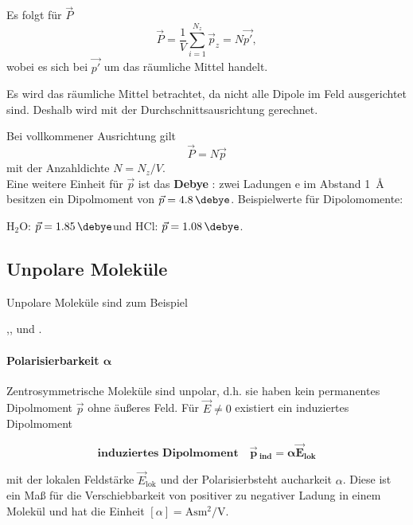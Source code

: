 
    Es folgt für $\vec{P}$
    \begin{equation}
    	\label{2.5}
    	\vec{P} = \frac{1}{V} \sum_{i = 1}^{N_{z}} \vec{p}_{z}= N \vec{p'},
    \end{equation}
    wobei es sich bei $\vec{p'}$ um das räumliche Mittel handelt.
    \begin{verbal}
        Es wird das räumliche Mittel betrachtet, da nicht alle Dipole im Feld ausgerichtet sind. Deshalb wird mit der Durchschnittsausrichtung gerechnet.
    \end{verbal}
    Bei vollkommener Ausrichtung gilt
    \begin{equation}
    	\vec{P} = N \vec{p}
    \end{equation}
    mit der Anzahldichte $N = N_{z}/V$.\\
    
    Eine weitere Einheit für $\vec{p}$ ist das \textbf{Debye} \si{\debye}: 
    zwei Ladungen e im Abstand \SI{1}{\angstrom} besitzen ein Dipolmoment von $ \vec{p} = \SI{4,8}{\debye}$. 
    Beispielwerte für Dipolomomente:
    \begin{center}
        H${}_2$O: $\vec p=\SI{1,85}{\debye}$\quad und \quad HCl: $\vec p=\SI{1,08}{\debye}$.
    \end{center}
    \subsection{Unpolare Moleküle}
    Unpolare Moleküle sind zum Beispiel
    \begin{center}
    	,\qquad {},\qquad {} \qquad und \qquad{}.
    \end{center}

\paragraph{Polarisierbarkeit $\bm\alpha$}
    Zentrosymmetrische Moleküle sind unpolar, d.h. sie haben kein permanentes Dipolmoment $\vec{p}$ ohne äußeres Feld. Für $\vec{E} \neq 0$ existiert ein induziertes Dipolmoment

    \begin{important}
        \begin{equation}
            \textbf{induziertes Dipolmoment}\quad
        	\bm{\vec{p}\,_{\textbf{ind}} = \alpha \vec{E}_{\textbf{lok}}}
        \end{equation}
    \end{important}
    mit der lokalen Feldstärke $\vec{E}_{\text{lok}}$ und der {Polarisierbsteht aucharkeit} $\alpha$. Diese ist ein Maß für die Verschiebbarkeit von positiver zu negativer Ladung in einem Molekül und hat die Einheit $\left[ \alpha \right] = \si{\ampere \second \meter \squared  \per \volt}$.\\
    
